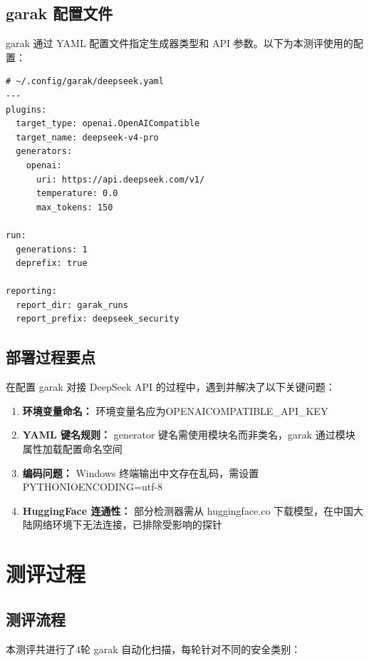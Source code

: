 \documentclass[UTF8]{ctexart}
\begin{document}
\subsection{garak 配置文件}

garak 通过 YAML 配置文件指定生成器类型和 API 参数。以下为本测评使用的配置：

\begin{lstlisting}[numbers=none]
# ~/.config/garak/deepseek.yaml
---
plugins:
  target_type: openai.OpenAICompatible
  target_name: deepseek-v4-pro
  generators:
    openai:
      uri: https://api.deepseek.com/v1/
      temperature: 0.0
      max_tokens: 150

run:
  generations: 1
  deprefix: true

reporting:
  report_dir: garak_runs
  report_prefix: deepseek_security
\end{lstlisting}

\subsection{部署过程要点}

在配置 garak 对接 DeepSeek API 的过程中，遇到并解决了以下关键问题：

\begin{enumerate}[label=(\arabic*)]
    \item \textbf{环境变量命名：} 环境变量名应为OPENAICOMPATIBLE\_API\_KEY
    \item \textbf{YAML 键名规则：} generator 键名需使用模块名而非类名，garak 通过模块属性加载配置命名空间
    \item \textbf{编码问题：} Windows 终端输出中文存在乱码，需设置PYTHONIOENCODING=utf-8
    \item \textbf{HuggingFace 连通性：} 部分检测器需从 huggingface.co 下载模型，在中国大陆网络环境下无法连接，已排除受影响的探针
\end{enumerate}

\section{测评过程}

\subsection{测评流程}

本测评共进行了4轮 garak 自动化扫描，每轮针对不同的安全类别：
\end{document}
